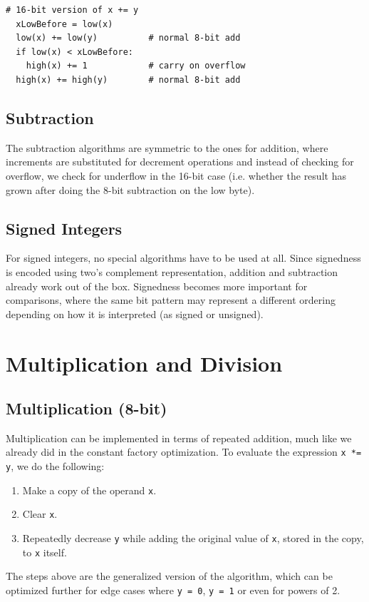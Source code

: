 \begin{lstfloat}[H]
\begin{lstlisting}[style=pseudocode]
  # 16-bit version of x += y
  xLowBefore = low(x)
  low(x) += low(y)          # normal 8-bit add
  if low(x) < xLowBefore:
    high(x) += 1            # carry on overflow
  high(x) += high(y)        # normal 8-bit add
\end{lstlisting}
\caption{High-level pseudocode for 16-bit addition with carry propagation.}
\label{lst:16bitadd}
\end{lstfloat}

\subsection{Subtraction}
\label{sec:compilation:subtraction}
The subtraction algorithms are symmetric to the ones for addition, where increments are substituted for decrement operations and instead of checking for overflow, we check for underflow in the 16-bit case (i.e. whether the result has grown after doing the 8-bit subtraction on the low byte).

\subsection{Signed Integers}
\label{sec:compilation:signedintegers}
For signed integers, no special algorithms have to be used at all. Since signedness is encoded using two's complement representation, addition and subtraction already work out of the box. Signedness becomes more important for comparisons, where the same bit pattern may represent a different ordering depending on how it is interpreted (as signed or unsigned).

\section{Multiplication and Division}
\label{sec:compilation:muldiv}
\subsection{Multiplication (8-bit)}\label{sec:compilation:mul8} Multiplication can be implemented in terms of repeated addition, much like we already did in the constant factory optimization. To evaluate the expression \texttt{x *= y}, we do the following:
\begin{enumerate}
\item Make a copy of the operand \texttt{x}.
\item Clear \texttt{x}.
\item Repeatedly decrease \texttt{y} while adding the original value of \texttt{x}, stored in the copy, to \texttt{x} itself.
\end{enumerate}
The steps above are the generalized version of the algorithm, which can be optimized further for edge cases where \texttt{y = 0}, \texttt{y = 1} or even for powers of 2.

